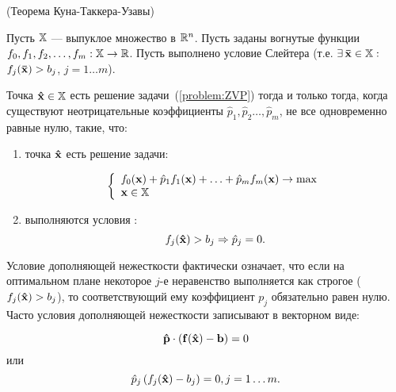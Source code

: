 \begin{teop}(Теорема Куна-Таккера-Узавы)

Пусть $\mathbb{X}$ --- выпуклое множество в $\mathbb{R}^n$. Пусть заданы
вогнутые функции $f_0, f_1, f_2, \ldots, f_m: \mathbb{X} \to \mathbb{R}$. Пусть
выполнено условие Слейтера (т.е. $\exists \, \mathbf{\bar x} \in
\mathbb{X}:$ ${f_j(\mathbf{\bar x}) > b_j}$, ${j=1 \ldots m}$).

Точка $\mathbf{\hat x}\in \mathbb{X}$ есть решение
задачи~(\ref{problem:ZVP}) тогда и только тогда, когда существуют
неотрицательные коэффициенты $\hat p_1, \hat p_2 \ldots, \hat p_m$,
не все одновременно равные нулю, такие, что:

\begin{enumerate}
\renewcommand{\theenumi}{(\arabic{enumi})}
\item точка $\mathbf{\hat x}$ есть решение задачи:

\[
\left\{ \begin{array}{l}
 f_0(\mathbf{x}) + \hat p_1 f_1(\mathbf{x})+ \ldots + \hat p_m f_m(\mathbf{x}) \to \max  \\
 \mathbf{x} \in \mathbb{X} \\
 \end{array} \right.
\]


\item выполняются условия :
\[f_j(\mathbf{\hat x}) > b_j \Rightarrow \hat p_j =0.\]

\end{enumerate}
\end{teop}

Условие дополняющей нежесткости фактически означает, что если на
оптимальном плане некоторое $j$-е неравенство выполняется как
строгое ($f_j(\mathbf{\hat x}) > b_j$), то соответствующий ему
коэффициент $p_j$ обязательно равен нулю. Часто условия дополняющей
нежесткости записывают в векторном виде:

\[\mathbf{\hat p} \cdot (\mathbf{f}(\mathbf{\hat x})- \mathbf{b})=0\]
или
\[\hat p_j \,(f_j(\mathbf{\hat x}) - b_j)=0, j=1 \ldots m.\]


